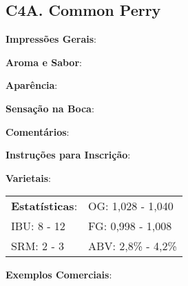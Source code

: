\subsection*{C4A. Common Perry}

\textbf{Impressões Gerais}:

\textbf{Aroma e Sabor}:

\textbf{Aparência}:

\textbf{Sensação na Boca}:

\textbf{Comentários}:

\textbf{Instruções para Inscrição}:

\textbf{Varietais}:

\begin{tabular}{@{}p{35mm}p{35mm}@{}}
  \textbf{Estatísticas}: & OG: 1,028 - 1,040 \\
  IBU: 8 - 12  & FG: 0,998 - 1,008 \\
  SRM: 2 - 3  & ABV: 2,8\% - 4,2\%
\end{tabular}

\textbf{Exemplos Comerciais}: